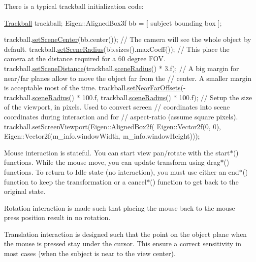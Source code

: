 There is a typical trackball initialization code\+: 
\begin{DoxyCode}
\hyperlink{class_trackball}{Trackball} trackball;
Eigen::AlignedBox3f bb = [ subject bounding box ];

trackball.\hyperlink{class_trackball_a279072f30b8e41189b05ce0a1caf36a0}{setSceneCenter}(bb.center());
\textcolor{comment}{// The camera will see the whole object by default.}
trackball.\hyperlink{class_trackball_ab546e1363934d09d8ed292dbd8b34e51}{setSceneRadius}(bb.sizes().maxCoeff());
\textcolor{comment}{// This place the camera at the distance required for a 60 degree FOV.}
trackball.\hyperlink{class_trackball_a20407b903581f2e34ca12592f8e0c41a}{setSceneDistance}(trackball.\hyperlink{class_trackball_acd26e3c6e72d935e556e6b10bd2a0c1d}{sceneRadius}() * 3.f);
\textcolor{comment}{// A big margin for near/far planes allow to move the object far from the}
\textcolor{comment}{// center. A smaller margin is acceptable most of the time.}
trackball.\hyperlink{class_trackball_adb8173ceaf1d83d324751a6379f769ef}{setNearFarOffsets}(-trackball.\hyperlink{class_trackball_acd26e3c6e72d935e556e6b10bd2a0c1d}{sceneRadius}() * 100.f,
                               trackball.\hyperlink{class_trackball_acd26e3c6e72d935e556e6b10bd2a0c1d}{sceneRadius}() * 100.f);
\textcolor{comment}{// Setup the size of the viewport, in pixels. Used to convert screen}
\textcolor{comment}{// coordinates into scene coordinates during interaction and for}
\textcolor{comment}{// aspect-ratio (assume square pixels).}
trackball.\hyperlink{class_trackball_aac926ad4f5144195a88b47203e3b5ca7}{setScreenViewport}(Eigen::AlignedBox2f(
        Eigen::Vector2f(0, 0),
        Eigen::Vector2f(m\_info.windowWidth, m\_info.windowHeight)));
\end{DoxyCode}


Mouse interaction is stateful. You can start view pan/rotate with the start$\ast$() functions. While the mouse move, you can update transform using drag$\ast$() functions. To return to Idle state (no interaction), you must use either an end$\ast$() function to keep the transformation or a cancel$\ast$() function to get back to the original state.

Rotation interaction is made such that placing the mouse back to the mouse press position result in no rotation.

Translation interaction is designed such that the point on the object plane when the mouse is pressed stay under the cursor. This ensure a correct sensitivity in most cases (when the subject is near to the view center).

